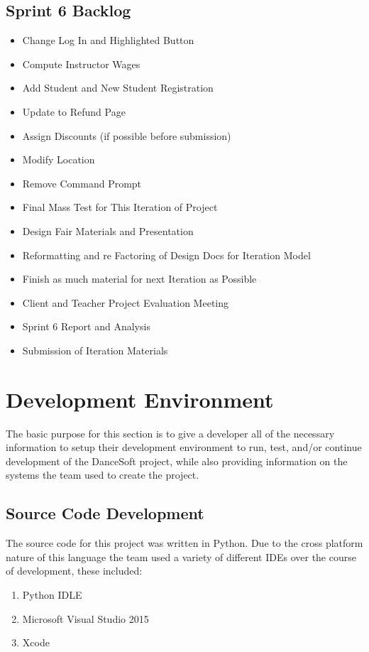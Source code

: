 \subsection{Sprint 6 Backlog}
\begin{itemize}
\item Change Log In and Highlighted Button
\item Compute Instructor Wages
\item Add Student and New Student Registration 
\item Update to Refund Page
\item Assign Discounts (if possible before submission) 
\item Modify Location
\item Remove Command Prompt 
\item Final Mass Test for This Iteration of Project
\item Design Fair Materials and Presentation
\item Reformatting and re Factoring of Design Docs for Iteration Model
\item Finish as much material for next Iteration as Possible
\item Client and Teacher Project Evaluation Meeting
\item Sprint 6 Report and Analysis
\item Submission of Iteration Materials 
\end{itemize}   


\section{Development Environment}
The basic purpose for this section is to give a developer all of the necessary information to setup their development environment to run, test, and/or continue development of the DanceSoft project, while also providing information on the systems the team used to create the project.

\subsection{Source Code Development}
The source code for this project was written in Python. Due to the cross platform nature of this language the team used a variety of different IDEs over the course of development, these included:

\begin{enumerate}
\item Python IDLE
\item Microsoft Visual Studio 2015
\item Xcode 
\end{enumerate}

